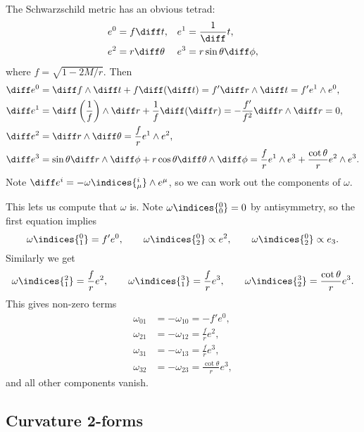 \documentclass[12pt]{article}
\begin{document}
\begin{exbox}
	The Schwarzschild metric has an obvious tetrad:
	\begin{align*}
		e^0 &= f \diff t, & e^1 &= \frac 1 \diff t, \\
		e^2 &= r \diff \theta & e^3 &= r \sin \theta \diff \phi,
	\end{align*}
	where $f = \sqrt{1 - 2M/r}$. Then
	\begin{align*}
		\diff e^0 &= \diff f \wedge \diff t + f \diff(\diff t) = f' \diff r \wedge \diff t = f' e^1 \wedge e^0, \\
		\diff e^1 &= \diff \left( \frac 1f \right) \wedge \diff r + \frac 1f \diff (\diff r) = - \frac{f'}{f^2} \diff r \wedge \diff r = 0, \\
		\diff e^2 &= \diff r \wedge \diff \theta = \frac fr e^1 \wedge e^2, \\
		\diff e^3 &= \sin \theta \diff r \wedge \diff \phi + r \cos \theta \diff \theta \wedge \diff \phi = \frac fr e^1 \wedge e^3 + \frac{\cot \theta}{r} e^2 \wedge e^3.
	\end{align*}
	Note $\diff e^i = -\omega\indices{^{i}_{\mu}} \wedge e^\mu$, so we can work out the components of $\omega$.

	This lets us compute that $\omega$ is. Note $\omega\indices{^{0}_{0}} = 0$ by antisymmetry, so the first equation implies
	\[
	\omega\indices{^{0}_{1}} = f' e^0, \qquad \omega\indices{^{0}_{2}} \propto e^2, \qquad \omega\indices{^{0}_{2}} \propto e_3.
	\]
	Similarly we get
	\[
	\omega\indices{^{2}_{1}} = \frac fr e^2, \qquad \omega\indices{^{3}_{1}} = \frac fr e^3, \qquad \omega\indices{^{3}_{2}} = \frac{\cot \theta}{r} e^3.
	\]
	This gives non-zero terms
	\begin{align*}
		\omega_{01} &= - \omega_{10} = -f' e^0, \\
		\omega_{21} &= - \omega_{12} = \frac fr e^2, \\
		\omega_{31} &= - \omega_{13 } = \frac fr e^3, \\
		\omega_{32} &= - \omega_{23} = \frac{\cot \theta}{r} e^3,
	\end{align*}
	and all other components vanish.
\end{exbox}

\subsection{Curvature 2-forms}%
\label{sub:ctf}
\end{document}

